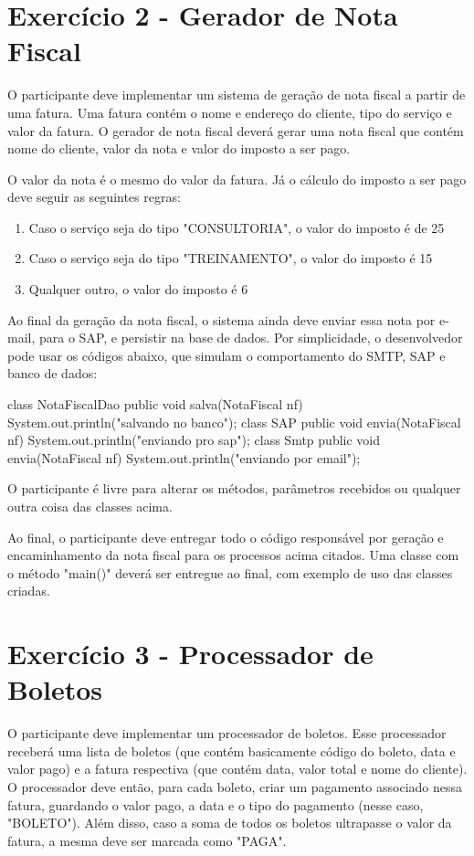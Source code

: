 \section{Exercício 2 - Gerador de Nota Fiscal}

O participante deve implementar um sistema de geração de nota fiscal a partir de uma fatura. 
Uma fatura contém o nome e endereço do cliente, tipo do serviço e valor da fatura. O gerador de
nota fiscal deverá gerar uma nota fiscal que contém nome do cliente, valor da nota e valor
do imposto a ser pago.

O valor da nota é o mesmo do valor da fatura. Já o cálculo do imposto a ser pago deve seguir
as seguintes regras:

\begin{enumerate}
	\item Caso o serviço seja do tipo "CONSULTORIA", o valor do imposto é de 25%
	\item Caso o serviço seja do tipo "TREINAMENTO", o valor do imposto é 15%
	\item Qualquer outro, o valor do imposto é 6%
\end{enumerate}

Ao final da geração da nota fiscal, o sistema ainda deve enviar essa nota por e-mail,
para o SAP, e persistir na base de dados. Por simplicidade, o desenvolvedor pode usar
os códigos abaixo, que simulam o comportamento do SMTP, SAP e banco de dados:

class NotaFiscalDao {
	public void salva(NotaFiscal nf) { System.out.println("salvando no banco"); }
}
class SAP {
	public void envia(NotaFiscal nf) { System.out.println("enviando pro sap"); }
}
class Smtp {
	public void envia(NotaFiscal nf) { System.out.println("enviando por email"); }
}

O participante é livre para alterar os métodos, parâmetros recebidos ou qualquer outra coisa das classes acima.

Ao final, o participante deve entregar todo o código responsável por geração e encaminhamento da nota fiscal 
para os processos acima citados. Uma classe com o método "main()" deverá ser entregue ao final, com
exemplo de uso das classes criadas.

\section{Exercício 3 - Processador de Boletos}

O participante deve implementar um processador de boletos. Esse processador receberá uma lista de boletos 
(que contém basicamente código do boleto, data e valor pago) e a fatura respectiva (que contém data, valor total e nome do cliente). 
O processador deve então, para cada boleto, criar um pagamento associado nessa fatura,
guardando o valor pago, a data e o tipo do pagamento (nesse caso, "BOLETO").
Além disso, caso a soma de todos os boletos ultrapasse o valor da fatura, a mesma deve ser marcada
como "PAGA".

